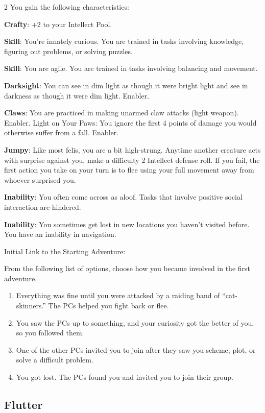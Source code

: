 \begin{multicols}{2}
You gain the following characteristics:

\textbf{Crafty}: +2 to your Intellect Pool.

\textbf{Skill}: You’re innately curious. You are trained in tasks involving knowledge, figuring out problems, or solving puzzles.

\textbf{Skill}: You are agile. You are trained in tasks involving balancing and movement.

\textbf{Darksight}: You can see in dim light as though it were bright light and see in darkness as though it were dim light. Enabler.

\textbf{Claws}: You are practiced in making unarmed claw attacks (light weapon). Enabler.
Light on Your Paws: You ignore the first 4 points of damage you would otherwise suffer from a fall. Enabler.

\textbf{Jumpy}: Like most felis, you are a bit high-strung. Anytime another creature acts with surprise against you, make a difficulty 2 Intellect defense roll. If you fail, the first action you take on your turn is to flee using your full movement away from whoever surprised you.

\textbf{Inability}: You often come across as aloof. Tasks that involve positive social interaction are hindered.

\textbf{Inability}: You sometimes get lost in new locations you haven’t visited before. You have an inability in navigation.

Initial Link to the Starting Adventure:

From the following list of options, choose how you became involved in the first adventure.
\begin{enumerate}
\item  Everything was fine until you were attacked by a raiding band of “cat-skinners.” The PCs helped you fight back or flee.
\item  You saw the PCs up to something, and your curiosity got the better of you, so you followed them.
\item  One of the other PCs invited you to join after they saw you scheme, plot, or solve a difficult problem.
\item  You got lost. The PCs found you and invited you to join their group.
\end{enumerate}

\subsection{Flutter}


\end{multicols}
